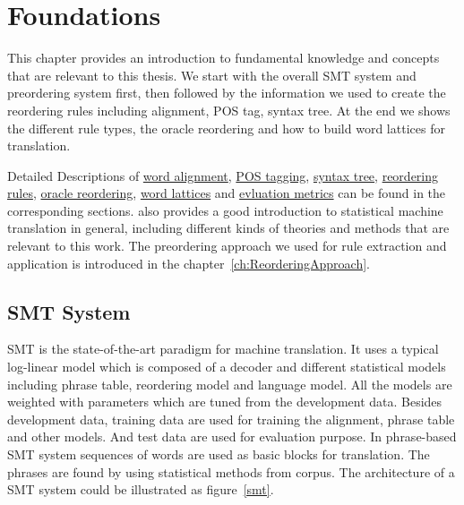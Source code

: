 
\chapter{Foundations}
\label{ch:Foundations}

This chapter provides an introduction to fundamental knowledge and concepts that are relevant to this thesis. We start with the overall \ac{SMT} system and preordering system first, then followed by the information we used to create the reordering rules including alignment, POS tag, syntax tree. At the end we shows the different rule types, the oracle reordering and how to build word lattices for translation. 

Detailed Descriptions of \hyperref[ch:Foundations:sec:Alignment]{word alignment}, \hyperref[ch:Foundations:sec:PosTag]{POS tagging}, \hyperref[ch:Foundations:sec:SyntacticTree]{syntax tree},
\hyperref[ch:Foundations:sec:types]{reordering rules},
\hyperref[ch:Foundations:sec:oracle]{oracle reordering},
\hyperref[ch:Foundations:sec:Lattices]{word lattices} and 
\hyperref[ch:Foundations:sec:bleu]{evluation metrics} can be found in the corresponding sections. \cite{book} also provides a good introduction to statistical machine translation in general, including different kinds of theories and methods that are relevant to this work. The preordering approach we used for rule extraction and application is introduced in the chapter~\ref{ch:ReorderingApproach}.

\section{\acf{SMT} System}
\label{ch:Foundations:sec:SMTSystem}

\acf{SMT} is the state-of-the-art paradigm for machine translation. It uses a typical log-linear model which is composed of a decoder and different statistical models including phrase table, reordering model and language model. All the models are weighted with parameters which are tuned from the development data. Besides development data, training data are used for training the alignment, phrase table and other models. And test data are used for evaluation purpose. In phrase-based \ac{SMT} system sequences of words are used as basic blocks for translation. The phrases are found by using statistical methods from corpus. The architecture of a \ac{SMT} system could be illustrated as figure~\ref{smt}.



